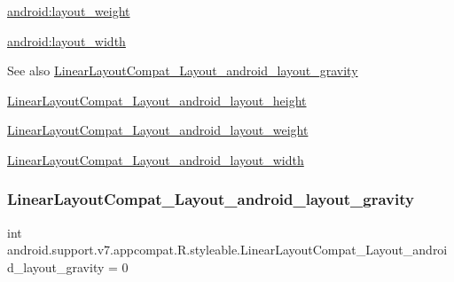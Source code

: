 {\ttfamily \hyperlink{classandroid_1_1support_1_1v7_1_1appcompat_1_1R_1_1styleable_a736d65ca5304ffad4894d0eda896ee4e}{android\+:layout\+\_\+weight}}

{\ttfamily \hyperlink{classandroid_1_1support_1_1v7_1_1appcompat_1_1R_1_1styleable_abba24b21ee9c7d9d04832f6adbe2aaf8}{android\+:layout\+\_\+width}}

\begin{DoxySeeAlso}{See also}
\hyperlink{classandroid_1_1support_1_1v7_1_1appcompat_1_1R_1_1styleable_a74cba1962f48bb8a5e322a56f2701a54}{Linear\+Layout\+Compat\+\_\+\+Layout\+\_\+android\+\_\+layout\+\_\+gravity} 

\hyperlink{classandroid_1_1support_1_1v7_1_1appcompat_1_1R_1_1styleable_ab19ac17e3b2ed7081664217655762b35}{Linear\+Layout\+Compat\+\_\+\+Layout\+\_\+android\+\_\+layout\+\_\+height} 

\hyperlink{classandroid_1_1support_1_1v7_1_1appcompat_1_1R_1_1styleable_a736d65ca5304ffad4894d0eda896ee4e}{Linear\+Layout\+Compat\+\_\+\+Layout\+\_\+android\+\_\+layout\+\_\+weight} 

\hyperlink{classandroid_1_1support_1_1v7_1_1appcompat_1_1R_1_1styleable_abba24b21ee9c7d9d04832f6adbe2aaf8}{Linear\+Layout\+Compat\+\_\+\+Layout\+\_\+android\+\_\+layout\+\_\+width} 
\end{DoxySeeAlso}
\mbox{\label{classandroid_1_1support_1_1v7_1_1appcompat_1_1R_1_1styleable_a74cba1962f48bb8a5e322a56f2701a54}} 
\subsubsection{\texorpdfstring{Linear\+Layout\+Compat\+\_\+\+Layout\+\_\+android\+\_\+layout\+\_\+gravity}{LinearLayoutCompat\_Layout\_android\_layout\_gravity}}
{\footnotesize\ttfamily int android.\+support.\+v7.\+appcompat.\+R.\+styleable.\+Linear\+Layout\+Compat\+\_\+\+Layout\+\_\+android\+\_\+layout\+\_\+gravity = 0\hspace{0.3cm}{\ttfamily [static]}}

